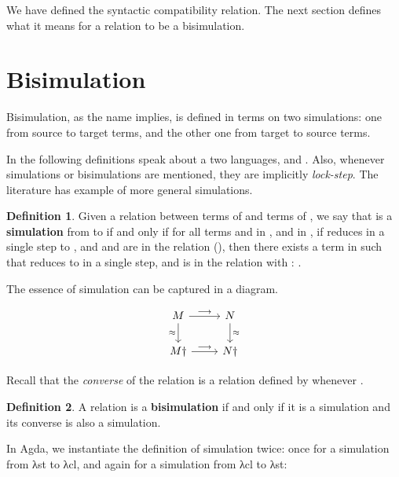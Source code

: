 \documentclass[bsc,frontabs,oneside,singlespacing,parskip,deptreport]{infthesis}
\theoremstyle{definition}
\newtheorem*{definition}{Definition}
\theoremstyle{lemma}
\begin{document}
We have defined the syntactic compatibility relation. The next
section defines what it means for a relation to be a bisimulation.

\section{Bisimulation}

Bisimulation, as the name implies, is defined in terms on two
simulations: one from source to target terms, and the other one from
target to source terms.

In the following definitions speak about a two languages,  and
. Also, whenever simulations or bisimulations are mentioned,
they are implicitly \textit{lock-step}. The literature has example of
more general simulations.

\begin{definition}
  Given a relation  between terms of  and terms of ,
  we say that  is a \textbf{simulation} from  to  if
  and only if for all terms  and  in , and 
  in , if  reduces in a single step to , and 
  and  are in the  relation (), then there
  exists a term  in  such that  reduces to 
  in a single step, and  is in the  relation with :
  .
\end{definition}

The essence of simulation can be captured in a diagram.

\[ \begin{tikzcd}
M \arrow{r}{\longrightarrow} \arrow[swap]{d}{\approx} & N \arrow{d}{\approx} \\%
M \dagger \arrow{r}{\longrightarrow}& N \dagger
\end{tikzcd}
\]

Recall that the \textit{converse} of the relation  is a relation
 defined by  whenever .

\begin{definition}
  A relation  is a \textbf{bisimulation} if and only if it is a
  simulation and its converse is also a simulation.
\end{definition}

In Agda, we instantiate the definition of simulation twice: once for a
simulation from λst to λcl, and again for a simulation from λcl to
λst:

\end{document}
